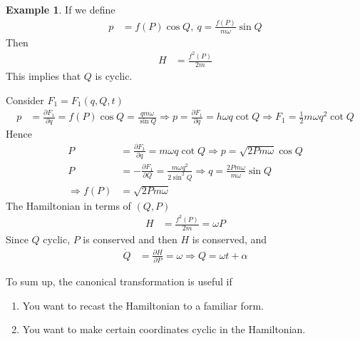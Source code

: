 \documentclass[twoside,9pt]{article}
\numberwithin{equation}{section} %
\newcommand{\lms}{\fontfamily{lmss}\selectfont} %
\theoremstyle{definition}
\newtheorem{example}{\lms Example}[section]
\theoremstyle{remark}
\begin{document}
\begin{example}
If we define
\begin{align*}
    p &= f(P)\cos Q,~
    q  = \frac{f(P)}{m\omega}\sin Q
\end{align*}
Then
\begin{align*}
    H &= \frac{f^2(P)}{2m}
\end{align*}
This implies that $Q$ is cyclic.

Consider $F_1=F_1(q,Q,t)$
\begin{align*}
    p &= \frac{\partial F_1}{\partial q}
    = f(P)\cos Q = \frac{qm\omega}{\sin Q}
    \Rightarrow
    p = \frac{\partial F_1}{\partial q} = h\omega q\cot Q
    \Rightarrow
    F_1 = \frac{1 }{2}m\omega q^2 \cot Q
\end{align*}
Hence
\begin{align*}
    P &= \frac{\partial F_1}{\partial q} = m\omega q\cot Q
    \Rightarrow p = \sqrt{2Pm\omega}\cos Q\\
    P &= -\frac{\partial F_1}{\partial Q}
    = \frac{m\omega q^2}{2\sin^2 Q}
    \Rightarrow q = \frac{2Pm\omega}{m\omega}\sin Q\\
    \Rightarrow f(P) &= \sqrt{2Pm\omega}
\end{align*}
The Hamiltonian in terms of $(Q,P)$
\begin{align*}
    H &= \frac{f^2(P)}{2m} = \omega P
\end{align*}
Since $Q$ cyclic, $P$ is conserved and then $H$ is conserved,
and
\begin{align*}
    \dot Q &= \frac{\partial H}{\partial P} = \omega
    \Rightarrow Q = \omega t + \alpha
\end{align*}
\end{example}
To sum up, the canonical transformation is useful if 
\begin{enumerate}[label=\arabic*)]
\item You want to recast the Hamiltonian to a familiar form.
\item You want to make certain coordinates cyclic in the Hamiltonian.
\end{enumerate}
\end{document}
